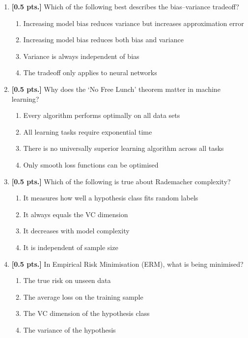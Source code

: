 \documentclass[11pt,a4paper]{article}
\begin{document}
\begin{enumerate}[label=\textbf{\arabic*.}]
    \item \textbf{[0.5 pts.]} Which of the following best describes the bias--variance tradeoff?
    \begin{enumerate}[label=(\alph*)]
        \item Increasing model bias reduces variance but increases approximation error
        \item Increasing model bias reduces both bias and variance
        \item Variance is always independent of bias
        \item The tradeoff only applies to neural networks
    \end{enumerate}

    \item \textbf{[0.5 pts.]} Why does the `No Free Lunch' theorem matter in machine learning?
    \begin{enumerate}[label=(\alph*)]
        \item Every algorithm performs optimally on all data sets
        \item All learning tasks require exponential time
        \item There is no universally superior learning algorithm across all tasks
        \item Only smooth loss functions can be optimised
    \end{enumerate}

    \item \textbf{[0.5 pts.]} Which of the following is true about Rademacher complexity?
    \begin{enumerate}[label=(\alph*)]
        \item It measures how well a hypothesis class fits random labels
        \item It always equals the VC dimension
        \item It decreases with model complexity
        \item It is independent of sample size
    \end{enumerate}

    \item \textbf{[0.5 pts.]} In Empirical Risk Minimisation (ERM), what is being minimised?
    \begin{enumerate}[label=(\alph*)]
        \item The true risk on unseen data
        \item The average loss on the training sample
        \item The VC dimension of the hypothesis class
        \item The variance of the hypothesis
    \end{enumerate}


\end{enumerate}
\end{document}
